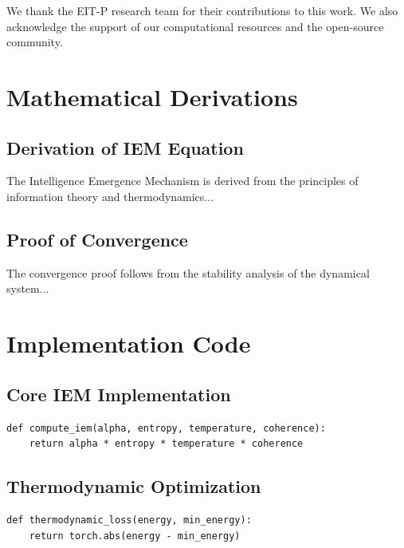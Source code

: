 \documentclass[12pt]{article}
\begin{document}
We thank the EIT-P research team for their contributions to this work. We also acknowledge the support of our computational resources and the open-source community.




\appendix

\section{Mathematical Derivations}

\subsection{Derivation of IEM Equation}

The Intelligence Emergence Mechanism is derived from the principles of information theory and thermodynamics...

\subsection{Proof of Convergence}

The convergence proof follows from the stability analysis of the dynamical system...

\section{Implementation Code}

\subsection{Core IEM Implementation}

\begin{verbatim}
def compute_iem(alpha, entropy, temperature, coherence):
    return alpha * entropy * temperature * coherence
\end{verbatim}

\subsection{Thermodynamic Optimization}

\begin{verbatim}
def thermodynamic_loss(energy, min_energy):
    return torch.abs(energy - min_energy)
\end{verbatim}
\end{document}

